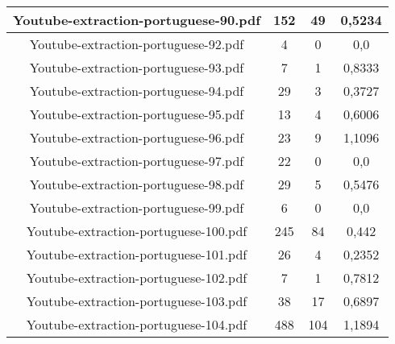 \documentclass[11pt]{article}
\newlength\mylength
\begin{document}
\begin{center}
\begin{longtable}{||C{.40\mylength}||C{.30\mylength}||C{.30\mylength}||C{.30\mylength}||}
  Youtube-extraction-portuguese-90.pdf & 152 & 49 & 0,5234 \\  \hline
  Youtube-extraction-portuguese-92.pdf & 4 & 0 & 0,0 \\  \hline
  Youtube-extraction-portuguese-93.pdf & 7 & 1 & 0,8333 \\  \hline
  Youtube-extraction-portuguese-94.pdf & 29 & 3 & 0,3727 \\  \hline
  Youtube-extraction-portuguese-95.pdf & 13 & 4 & 0,6006 \\  \hline
  Youtube-extraction-portuguese-96.pdf & 23 & 9 & 1,1096 \\  \hline
  Youtube-extraction-portuguese-97.pdf & 22 & 0 & 0,0 \\  \hline
  Youtube-extraction-portuguese-98.pdf & 29 & 5 & 0,5476 \\  \hline
  Youtube-extraction-portuguese-99.pdf & 6 & 0 & 0,0 \\  \hline
  Youtube-extraction-portuguese-100.pdf & 245 & 84 & 0,442 \\  \hline
  Youtube-extraction-portuguese-101.pdf & 26 & 4 & 0,2352 \\  \hline
  Youtube-extraction-portuguese-102.pdf & 7 & 1 & 0,7812 \\  \hline
  Youtube-extraction-portuguese-103.pdf & 38 & 17 & 0,6897 \\  \hline
  Youtube-extraction-portuguese-104.pdf & 488 & 104 & 1,1894 \\  \hline

\end{longtable}
\end{center}
\end{document}
